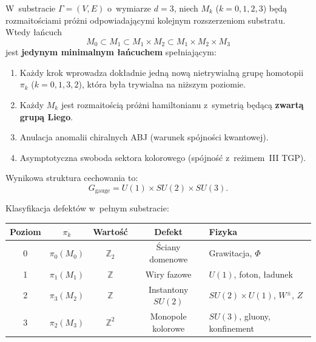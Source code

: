 \begin{theorem}%
\label{thm:D2-hierarchy-main}

W~substracie $\Gamma = (V,E)$ o~wymiarze $d = 3$,
niech $M_k$ ($k = 0, 1, 2, 3$) b\k{e}d\k{a} rozmaito\'sciami
pr\'o\.zni odpowiadaj\k{a}cymi kolejnym rozszerzeniom substratu.
Wtedy \l{}a\'ncuch
\begin{equation}\label{eq:D2-chain}
  M_0 \subset M_1 \subset M_1 \times M_2
  \subset M_1 \times M_2 \times M_3
\end{equation}
jest \textbf{jedynym minimalnym \l{}a\'ncuchem} spe\l{}niaj\k{a}cym:
\begin{enumerate}[nosep]
  \item[(H1)] Ka\.zdy krok wprowadza dok\l{}adnie jedn\k{a}
    now\k{a} nietrywialn\k{a} grup\k{e} homotopii $\pi_k$
    ($k = 0, 1, 3, 2$), kt\'ora by\l{}a trywialna
    na ni\.zszym poziomie.
  \item[(H2)] Ka\.zdy $M_k$ jest rozmaito\'sci\k{a} pr\'o\.zni
    hamiltonianu z~symetri\k{a} b\k{e}d\k{a}c\k{a}
    \textbf{zwart\k{a} grup\k{a} Liego}.
  \item[(H3)] Anulacja anomalii chiralnych ABJ
    (warunek sp\'ojno\'sci kwantowej).
  \item[(H4)] Asymptotyczna swoboda sektora kolorowego
    (sp\'ojno\'s\'c z~re\.zimem~III TGP).
\end{enumerate}
Wynikowa struktura cechowania to:
\begin{equation}\label{eq:D2-result}
  \boxed{
    G_{\mathrm{gauge}} = U(1) \times SU(2) \times SU(3).
  }
\end{equation}

Klasyfikacja defekt\'ow w~pe\l{}nym substracie:
\begin{center}\small
\begin{tabular}{ccccl}
\toprule
\textbf{Poziom} & \textbf{$\pi_k$} & \textbf{Warto\'s\'c}
  & \textbf{Defekt} & \textbf{Fizyka} \\
\midrule
0 & $\pi_0(M_0)$ & $\mathbb{Z}_2$ & \'Sciany domenowe
  & Grawitacja, $\Phi$ \\
1 & $\pi_1(M_1)$ & $\mathbb{Z}$  & Wiry fazowe
  & $U(1)$, foton, \l{}adunek \\
2 & $\pi_3(M_2)$ & $\mathbb{Z}$  & Instantony $SU(2)$
  & $SU(2) \times U(1)$, $W^\pm$, $Z$ \\
3 & $\pi_2(M_3)$ & $\mathbb{Z}^2$ & Monopole kolorowe
  & $SU(3)$, gluony, konfinement \\
\bottomrule
\end{tabular}
\end{center}
\end{theorem}


